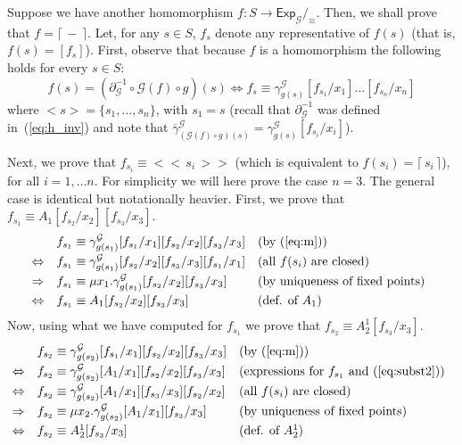 \documentclass{LMCS}
\newcommand\Exp{\mathsf{Exp}}
\newcommand\G{\mathcal{G}}
\def\expr#1{<\!< \, #1 \, >\!>}
\def\ceil#1{\lceil\, #1 \,\rceil}
\theoremstyle{definition}
\theoremstyle{plain}
\theoremstyle{plain}
\theoremstyle{plain}
\theoremstyle{plain}
\theoremstyle{definition}
\theoremstyle{definition}
\begin{document}
Suppose we have
another homomorphism $f\colon S\to \Exp_\G/_{\equiv}$. Then, we
shall prove that $f=\ceil -$. Let, for any $s\in S$, $f_s$ denote any 
representative of $f(s)$ (that is, $f(s)=[f_s]$). First, observe that 
because $f$ is a homomorphism the following holds for every $s\in S$:
\begin{equation}\label{eq:m}
f(s) = (\partial_{\G}^{-1} \circ \G(f) \circ g)(s) \Leftrightarrow
f_s\equiv  \gamma_{g(s)}^\G [f_{s_1}/x_1]\ldots [f_{s_n}/x_n]
\end{equation}
where $<s> = \{s_1,\ldots,s_n\}$, with $s_1=s$ (recall that
$\partial^{-1}_{\G}$ was defined in~(\ref{eq:h_inv}) and note that
$\overline\gamma^\G_{(\G(f) \circ g)(s)} = \gamma^\G_{g(s)} [f_{s_i}/x_{i}]$).

Next, we prove that $f_{s_i}\equiv \expr{s_i}$ (which is equivalent to $f(s_i) = \ceil {s_i}$), for all
$i=1,\ldots n$. For simplicity we will here prove the case $n=3$. The general case is identical but notationally heavier.
First, we prove that $f_{s_1} \equiv A_1[f_{s_2}/x_2][f_{s_3}/x_3]$.
\[
\begin{array}{@{}lll}
&f_{s_1} \equiv \gamma_{g(s_1)}^\G [f_{s_1}/x_1]  [f_{s_2}/x_2]  [f_{s_3}/x_3] &\text{(by~(\ref{eq:m})})\\[.8ex]
\Leftrightarrow& f_{s_1} \equiv \gamma_{g(s_1)}^\G [f_{s_2}/x_2]  [f_{s_3}/x_3] [f_{s_1}/x_1]  &\text{(all $f(s_i)$ are closed)}\\[.8ex]
\Rightarrow& f_{s_1} \equiv \mu x_1. \gamma_{g(s_1)}^\G [f_{s_2}/x_2]  [f_{s_3}/x_3]  &\text{(by uniqueness of fixed points)}\\[.8ex]
\Leftrightarrow& f_{s_1} \equiv A_1[f_{s_2}/x_2]  [f_{s_3}/x_3]  &\text{(def. of $A_1$)}
\end{array}
\]
Now, using what we have computed for $f_{s_1}$ we prove that $f_{s_2} \equiv A_2^1[f_{s_3}/x_3]$.
{
\[
\begin{array}{@{}lll} 
&f_{s_2} \equiv \gamma_{g(s_2)}^\G [f_{s_1}/x_1]  [f_{s_2}/x_2]  [f_{s_3}/x_3] &\text{(by~(\ref{eq:m})})\\[.8ex]
\Leftrightarrow&f_{s_2} \equiv \gamma_{g(s_2)}^\G [A_1/x_1]  [f_{s_2}/x_2]  [f_{s_3}/x_3]
&\text{(expressions for $f_{s_1}$ and (\ref{eq:subst2}))}\\[.8ex]
\Leftrightarrow& f_{s_2} \equiv \gamma_{g(s_2)}^\G [A_1/x_1]  [f_{s_3}/x_3] [f_{s_2}/x_2] &\text{(all $f(s_i)$ are closed)}\\[.8ex]
\Rightarrow& f_{s_2} \equiv \mu x_2. \gamma_{g(s_2)}^\G [A_1/x_1]  [f_{s_3}/x_3]  &\text{(by uniqueness of fixed points)}\\[.8ex]
\Leftrightarrow& f_{s_2} \equiv A_2^1[f_{s_3}/x_3]  &\text{(def. of $A_2^1$)}
\end{array}
\]}
\end{document}
